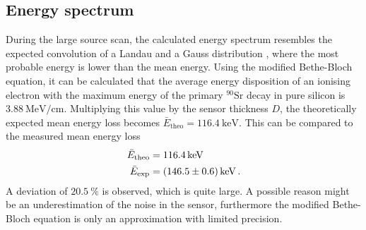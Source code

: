 \subsection{Energy spectrum}

During the large source scan, the calculated energy spectrum resembles the expected convolution of a
Landau and a Gauss distribution \cite{V15}, where the most probable energy is lower than the mean energy.
Using the modified Bethe-Bloch equation, it can be calculated that the average energy disposition 
of an ionising electron with the maximum energy of the primary $^{90}\text{Sr}$ decay in pure silicon is
$\qty{3.88}{\mega\electronvolt\per\centi\meter}$.
Multiplying this value by the sensor thickness $D$, the theoretically expected mean energy loss becomes
$\bar{E}_{\text{theo}} = \qty{116.4}{\kilo\electronvolt}$. This can be compared to the measured
mean energy loss
\begin{align*}
    \bar{E}_{\text{theo}} &= \qty{116.4}{\kilo\electronvolt} \\
    \bar{E}_{\text{exp}} &= \qty{146.5+-0.6}{\kilo\electronvolt}\, .
\end{align*}
A deviation of $\qty{20.5}{\percent}$ is observed, which is quite large. A possible reason might be an underestimation
of the noise in the sensor, furthermore the modified Bethe-Bloch equation is only an approximation with limited
precision.